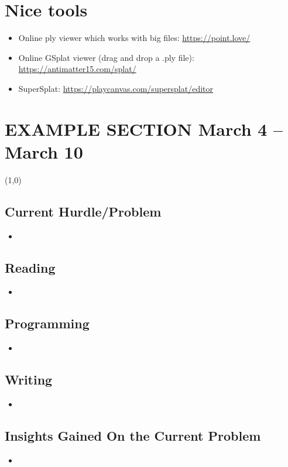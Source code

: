 \documentclass{article}
\begin{document}
\newpage

\section{Nice tools}
\begin{itemize}
    \item Online ply viewer which works with big files: \url{https://point.love/}
    \item Online GSplat viewer (drag and drop a .ply file): \url{https://antimatter15.com/splat/}
    \item SuperSplat: \url{https://playcanvas.com/supersplat/editor}
\end{itemize}


\newpage


\iffalse
\section{EXAMPLE SECTION March 4 -- March 10}
\line(1,0){\linewidth}

\subsection{Current Hurdle/Problem}
\begin{itemize}
\item 
\end{itemize}
\subsection{Reading}
\begin{itemize}
\item 
\end{itemize}

\subsection{Programming}
\begin{itemize}
\item 
\end{itemize}
\subsection{Writing}
\begin{itemize}
\item 
\end{itemize}
\subsection{Insights Gained On the Current Problem}
\begin{itemize}
\item 
\end{itemize}
\end{document}
